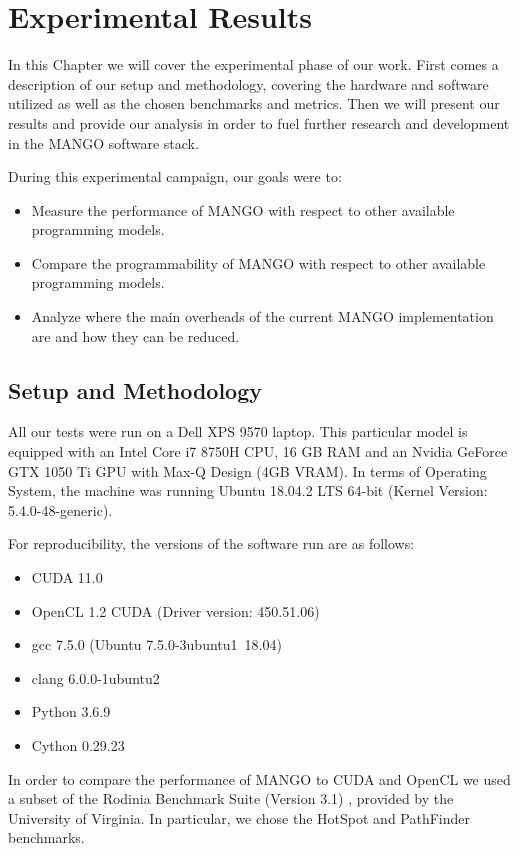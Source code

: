\chapter{Experimental Results} \label{ch:ExperimentalResults}
In this Chapter we will cover the experimental phase of our work. First comes a description of our setup and methodology, covering the hardware and software utilized as well as the chosen benchmarks and metrics. Then we will present our results and provide our analysis in order to fuel further research and development in the MANGO software stack.

During this experimental campaign, our goals were to:
\begin{itemize}
    \item Measure the performance of MANGO with respect to other available programming models.
    \item Compare the programmability of MANGO with respect to other available programming models.
    \item Analyze where the main overheads of the current MANGO implementation are and how they can be reduced.
\end{itemize}

\section{Setup and Methodology} \label{sect:setup-methodology}
All our tests were run on a Dell XPS 9570 laptop. This particular model is equipped with an Intel Core i7 8750H CPU, 16 GB RAM and an Nvidia GeForce GTX 1050 Ti GPU with Max-Q Design (4GB VRAM). In terms of Operating System, the machine was running Ubuntu 18.04.2 LTS 64-bit (Kernel Version: 5.4.0-48-generic).

For reproducibility, the versions of the software run are as follows:
\begin{itemize}
    \item CUDA 11.0
    \item OpenCL 1.2 CUDA (Driver version: 450.51.06)
    \item gcc 7.5.0 (Ubuntu 7.5.0-3ubuntu1~18.04)
    \item clang 6.0.0-1ubuntu2
    \item Python 3.6.9
    \item Cython 0.29.23
\end{itemize}

In order to compare the performance of MANGO to CUDA and OpenCL we used a subset of the Rodinia Benchmark Suite (Version 3.1) \cite{rodinia}, provided by the University of Virginia. In particular, we chose the HotSpot and PathFinder benchmarks.

